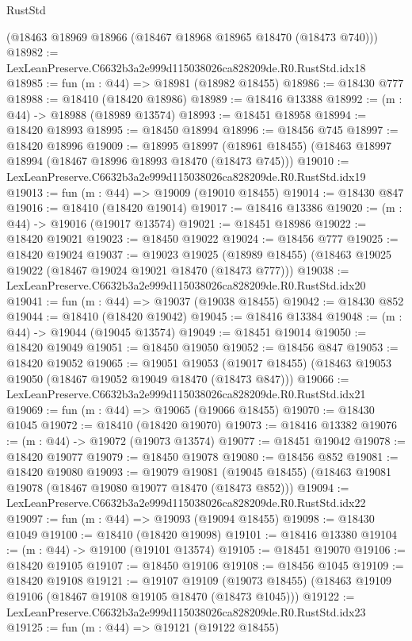 \begin{lexlean}{RustStd}
\begin{coremodule}
    (@18463 @18969 @18966 (@18467 @18968 @18965 @18470 (@18473 @740)))
@18982 := LexLeanPreserve.C6632b3a2e999d115038026ca828209de.R0.RustStd.idx18
@18985 := fun (m : @44) => @18981 (@18982 @18455)
@18986 := @18430 @777
@18988 := @18410 (@18420 @18986)
@18989 := @18416 @13388
@18992 := (m : @44) -> @18988 (@18989 @13574)
@18993 := @18451 @18958
@18994 := @18420 @18993
@18995 := @18450 @18994
@18996 := @18456 @745
@18997 := @18420 @18996
@19009 := @18995
    @18997
    (@18961 @18455)
    (@18463 @18997 @18994 (@18467 @18996 @18993 @18470 (@18473 @745)))
@19010 := LexLeanPreserve.C6632b3a2e999d115038026ca828209de.R0.RustStd.idx19
@19013 := fun (m : @44) => @19009 (@19010 @18455)
@19014 := @18430 @847
@19016 := @18410 (@18420 @19014)
@19017 := @18416 @13386
@19020 := (m : @44) -> @19016 (@19017 @13574)
@19021 := @18451 @18986
@19022 := @18420 @19021
@19023 := @18450 @19022
@19024 := @18456 @777
@19025 := @18420 @19024
@19037 := @19023
    @19025
    (@18989 @18455)
    (@18463 @19025 @19022 (@18467 @19024 @19021 @18470 (@18473 @777)))
@19038 := LexLeanPreserve.C6632b3a2e999d115038026ca828209de.R0.RustStd.idx20
@19041 := fun (m : @44) => @19037 (@19038 @18455)
@19042 := @18430 @852
@19044 := @18410 (@18420 @19042)
@19045 := @18416 @13384
@19048 := (m : @44) -> @19044 (@19045 @13574)
@19049 := @18451 @19014
@19050 := @18420 @19049
@19051 := @18450 @19050
@19052 := @18456 @847
@19053 := @18420 @19052
@19065 := @19051
    @19053
    (@19017 @18455)
    (@18463 @19053 @19050 (@18467 @19052 @19049 @18470 (@18473 @847)))
@19066 := LexLeanPreserve.C6632b3a2e999d115038026ca828209de.R0.RustStd.idx21
@19069 := fun (m : @44) => @19065 (@19066 @18455)
@19070 := @18430 @1045
@19072 := @18410 (@18420 @19070)
@19073 := @18416 @13382
@19076 := (m : @44) -> @19072 (@19073 @13574)
@19077 := @18451 @19042
@19078 := @18420 @19077
@19079 := @18450 @19078
@19080 := @18456 @852
@19081 := @18420 @19080
@19093 := @19079
    @19081
    (@19045 @18455)
    (@18463 @19081 @19078 (@18467 @19080 @19077 @18470 (@18473 @852)))
@19094 := LexLeanPreserve.C6632b3a2e999d115038026ca828209de.R0.RustStd.idx22
@19097 := fun (m : @44) => @19093 (@19094 @18455)
@19098 := @18430 @1049
@19100 := @18410 (@18420 @19098)
@19101 := @18416 @13380
@19104 := (m : @44) -> @19100 (@19101 @13574)
@19105 := @18451 @19070
@19106 := @18420 @19105
@19107 := @18450 @19106
@19108 := @18456 @1045
@19109 := @18420 @19108
@19121 := @19107
    @19109
    (@19073 @18455)
    (@18463 @19109 @19106 (@18467 @19108 @19105 @18470 (@18473 @1045)))
@19122 := LexLeanPreserve.C6632b3a2e999d115038026ca828209de.R0.RustStd.idx23
@19125 := fun (m : @44) => @19121 (@19122 @18455)

\end{coremodule}
\end{lexlean}
